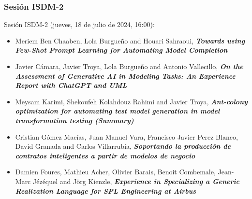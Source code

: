 \begin{frame}
  \frametitle{Sesión ISDM-2}
Sesión ISDM-2 (jueves, 18 de julio de 2024, 16:00):
\begin{itemize}

\item \small{Meriem Ben Chaaben, Lola Burgueño and Houari Sahraoui}, %
      {\bfseries\itshape Towards using Few-Shot Prompt Learning for Automating Model Completion}

\item \small{Javier Cámara, Javier Troya, Lola Burgueño and Antonio Vallecillo}, %
      {\bfseries\itshape On the Assessment of Generative AI in Modeling Tasks: An Experience Report with ChatGPT and UML}

\item \small{Meysam Karimi, Shekoufeh Kolahdouz Rahimi and Javier Troya}, %
      {\bfseries\itshape Ant-colony optimization for automating test model generation in model transformation testing (Summary)}

\item \small{Cristian Gómez Macías, Juan Manuel Vara, Francisco Javier Perez Blanco, David Granada and Carlos Villarrubia}, %
      {\bfseries\itshape Soportando la producción de contratos inteligentes a partir de modelos de negocio}

\item \small{Damien Foures, Mathieu Acher, Olivier Barais, Benoit Combemale, Jean-Marc Jézéquel and Jörg Kienzle}, %
      {\bfseries\itshape Experience in Specializing a Generic Realization Language for SPL Engineering at Airbus}

\end{itemize}
\end{frame}